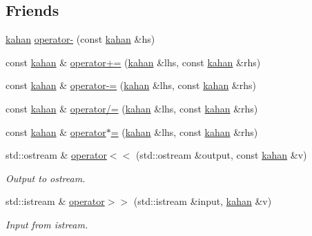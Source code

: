 \subsection*{Friends}
\begin{DoxyCompactItemize}
\item 
\mbox{\hyperlink{struct_space_h_1_1kahan}{kahan}} \mbox{\hyperlink{struct_space_h_1_1kahan_ab77d95a6c784d0d3aeb9c07c11cf4492}{operator-\/}} (const \mbox{\hyperlink{struct_space_h_1_1kahan}{kahan}} \&hs)
\item 
const \mbox{\hyperlink{struct_space_h_1_1kahan}{kahan}} \& \mbox{\hyperlink{struct_space_h_1_1kahan_a8183a5443769b1b64ab323558a4700fd}{operator+=}} (\mbox{\hyperlink{struct_space_h_1_1kahan}{kahan}} \&lhs, const \mbox{\hyperlink{struct_space_h_1_1kahan}{kahan}} \&rhs)
\item 
const \mbox{\hyperlink{struct_space_h_1_1kahan}{kahan}} \& \mbox{\hyperlink{struct_space_h_1_1kahan_ac0214cfa7da4475dd8f209f071c26dd8}{operator-\/=}} (\mbox{\hyperlink{struct_space_h_1_1kahan}{kahan}} \&lhs, const \mbox{\hyperlink{struct_space_h_1_1kahan}{kahan}} \&rhs)
\item 
const \mbox{\hyperlink{struct_space_h_1_1kahan}{kahan}} \& \mbox{\hyperlink{struct_space_h_1_1kahan_a3092bcb332eb3a793d58e34a8a82ff1e}{operator/=}} (\mbox{\hyperlink{struct_space_h_1_1kahan}{kahan}} \&lhs, const \mbox{\hyperlink{struct_space_h_1_1kahan}{kahan}} \&rhs)
\item 
const \mbox{\hyperlink{struct_space_h_1_1kahan}{kahan}} \& \mbox{\hyperlink{struct_space_h_1_1kahan_a23bc801f60370bf8a564989c7cf5da03}{operator$\ast$=}} (\mbox{\hyperlink{struct_space_h_1_1kahan}{kahan}} \&lhs, const \mbox{\hyperlink{struct_space_h_1_1kahan}{kahan}} \&rhs)
\item 
std\+::ostream \& \mbox{\hyperlink{struct_space_h_1_1kahan_a5f74f934a96e15e37de4023571d648a6}{operator$<$$<$}} (std\+::ostream \&output, const \mbox{\hyperlink{struct_space_h_1_1kahan}{kahan}} \&v)
\begin{DoxyCompactList}\small\item\em Output to ostream. \end{DoxyCompactList}\item 
std\+::istream \& \mbox{\hyperlink{struct_space_h_1_1kahan_a53c2b4bd3238b250075cb76fa4548f19}{operator$>$$>$}} (std\+::istream \&input, \mbox{\hyperlink{struct_space_h_1_1kahan}{kahan}} \&v)
\begin{DoxyCompactList}\small\item\em Input from istream. \end{DoxyCompactList}\end{DoxyCompactItemize}


